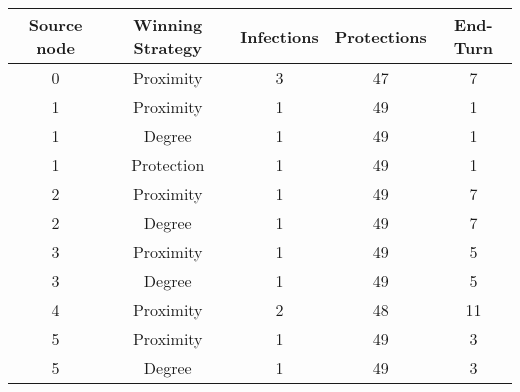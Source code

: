 \documentclass[results.tex]{subfiles}
\begin{document}
    \begin{center}
        \begin{tabular}{| c || c | c | c | c |}
            \hline
            {\bfseries Source node} & {\bfseries Winning Strategy} & {\bfseries Infections} & {\bfseries Protections}
            & {\bfseries End-Turn}
            \\  %
            \hline\hline
            0                       & Proximity                    & 3                      & 47                      & 7                    \\
            \hline
            1                       & Proximity                    & 1                      & 49                      & 1                    \\
            \hline
            1                       & Degree                       & 1                      & 49                      & 1                    \\
            \hline
            1                       & Protection                   & 1                      & 49                      & 1                    \\
            \hline
            2                       & Proximity                    & 1                      & 49                      & 7                    \\
            \hline
            2                       & Degree                       & 1                      & 49                      & 7                    \\
            \hline
            3                       & Proximity                    & 1                      & 49                      & 5                    \\
            \hline
            3                       & Degree                       & 1                      & 49                      & 5                    \\
            \hline
            4                       & Proximity                    & 2                      & 48                      & 11                   \\
            \hline
            5                       & Proximity                    & 1                      & 49                      & 3                    \\
            \hline
            5                       & Degree                       & 1                      & 49                      & 3                    \\

\end{tabular}
\end{center}
\end{document}
